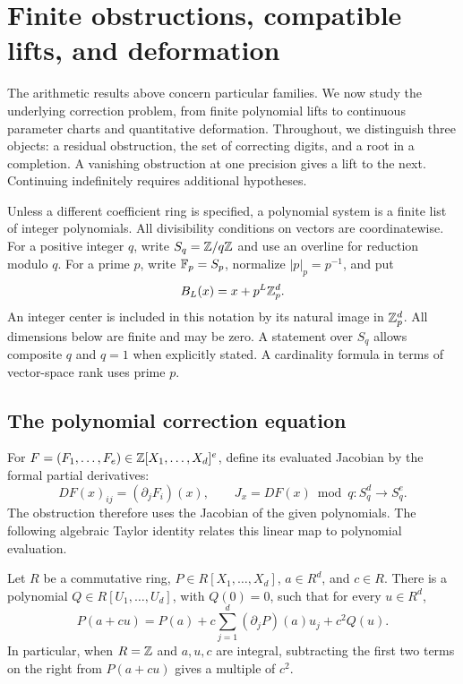 \section{Finite obstructions, compatible lifts, and deformation}
\label{sec:lifting}

The arithmetic results above concern particular families. We now study the
underlying correction problem, from finite polynomial lifts to continuous
parameter charts and quantitative deformation. Throughout, we distinguish
three objects: a residual obstruction, the set of correcting digits, and a
root in a completion. A vanishing obstruction at one precision gives a lift
to the next. Continuing indefinitely requires additional hypotheses.

Unless a different coefficient ring is specified, a polynomial system is a
finite list of integer polynomials. All divisibility conditions on vectors are
coordinatewise. For a positive integer $q$, write $S_q=\mathbb Z/q\mathbb Z$ and use an
overline for reduction modulo $q$. For a prime $p$, write
$\mathbb F_p=S_p$, normalize $|p|_p=p^{-1}$, and put
\[
 B_L(x)=x+p^L\mathbb Z_p^d.
\]
An integer center is included in this notation by its natural image in
$\mathbb Z_p^d$. All dimensions below are finite and may be zero. A statement over
$S_q$ allows composite $q$ and $q=1$ when explicitly stated. A cardinality
formula in terms of vector-space rank uses prime $p$.

\subsection{The polynomial correction equation}

For $F=(F_1,\ldots,F_e)\in\mathbb Z[X_1,\ldots,X_d]^e$, define its evaluated
Jacobian by the formal partial derivatives:
\[
 DF(x)_{ij}=(\partial_jF_i)(x),\qquad
 J_x=DF(x)\bmod q:S_q^d\longrightarrow S_q^e.
\]
The obstruction therefore uses the Jacobian of the given polynomials. The
following algebraic Taylor identity relates this linear map to polynomial
evaluation.

\begin{lemma}\label{lem:polynomial-taylor}
Let $R$ be a commutative ring, $P\in R[X_1,\ldots,X_d]$, $a\in R^d$, and
$c\in R$. There is a polynomial $Q\in R[U_1,\ldots,U_d]$, with $Q(0)=0$,
such that for every $u\in R^d$,
\begin{equation}\label{eq:polynomial-taylor}
 P(a+cu)=P(a)+c\sum_{j=1}^d(\partial_jP)(a)u_j+c^2Q(u).
\end{equation}
In particular, when $R=\mathbb Z$ and $a,u,c$ are integral, subtracting the first
two terms on the right from $P(a+cu)$ gives a multiple of $c^2$.
\end{lemma}

